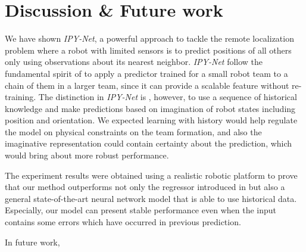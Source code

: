 \documentclass[letterpaper, 10 pt, conference]{ieeeconf}  %
\begin{document}
	
		

	\section{Discussion \& Future work}
	\label{sec:discussion_and_future_work}
	
	We have shown \emph{IPY-Net}, a powerful approach to tackle the remote localization problem 
	where a robot with limited sensors is to predict positions of all others only using 
	observations about its nearest neighbor. 
	\emph{IPY-Net} follow the fundamental spirit of \cite{Choi17} to apply a predictor 
	trained for a small robot team to a chain of them in a larger team, since it 
	can provide a scalable feature without re-training.   
	The distinction in \emph{IPY-Net} is , however, to use a sequence of historical knowledge and 
	make predictions based on imagination of robot states including position and orientation.
	We expected learning with history would help regulate the model on physical constraints on 
	the team formation, and also the imaginative representation could contain 
	certainty about the prediction, which would bring about more robust performance. 
	
	The experiment results were obtained using a realistic robotic platform to prove 
	that our method outperforms not only the regressor
	introduced in \cite{Choi17} but also a general state-of-the-art neural network 
	model that is able to use historical data. Especially, our model can present 
	stable performance even when the input contains some errors which have occurred in 
	previous prediction. 
	  
	
	In future work, 
	
	
{\small
	
	
}
\end{document}
